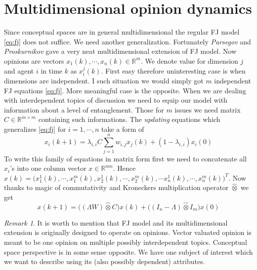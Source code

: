 \documentclass[leqno,12pt]{amsart}
\theoremstyle{remark}
\newtheorem{remark}[theorem]{Remark}
\theoremstyle{remark}
\theoremstyle{remark}
\theoremstyle{definition}
\numberwithin{equation}{section}
\newcommand{\R}{\ensuremath{\mathbb{R}}}
\begin{document}
\section{Multidimensional opinion dynamics}
Since conceptual spaces are in general multidimensional the regular FJ model \ref{eq:fj} does not suffice. We need another generalization. Fortunately \textit{Parsegov} and \textit{Proskurnikov} \cite{bib:parsegov} gave a very neat multidimensional extension of FJ model.
Now opinions are vectors $x_1(k), \cdots , x_n(k) \in \R^m$. We denote value for dimension $j$ and agent $i$ in time $k$ as $x^j_i(k)$. First easy therefore uninteresting case is when dimensions are independent. I such situation we would simply got $m$ independent FJ equations \ref{eq:fj}.
More meaningful case is the opposite. When we are dealing with interdependent topics of discussion we need to equip our model with information about a level of entanglement. Those for $m$ issues we need matrix $C\in\R^{m\times m}$ containing such informations.
The \textit{updating} equations which generalizes \ref{eq:fj} for $i = 1, \cdots, n$ take a form of
\begin{equation}\label{eq:mfjs}
    x_i(k+1)=\lambda_{i,i}C\sum\limits^n_{j=1}w_{i,j}x_j(k)+(1-\lambda_{i,i})x_i(0)
\end{equation}
To write this family of equations in matrix form first we need to concatenate all $x_i$'s into one column vector $x \in \R^{nm}$. Hence $x(k) = \big( x^1_1(k),\cdots , x^m_1(k), x^1_2(k), \cdots , x^m_2(k), \cdots x^1_n(k), \cdots , x^m_n(k) \big)^T$. Now thanks to magic of commutativity and Kroneckers multiplication operator $\hat\otimes$ we get
\begin{equation}\label{eq:mfj}
    x(k+1) = \big((\Lambda W) \hat\otimes C\big)x(k) + \big((I_n - \Lambda)\hat\otimes I_m\big)x(0)
\end{equation}
\begin{remark}
    It is worth to mention that FJ model and its multidimensional extension is originally designed to operate on opinions.  Vector valuated opinion is meant to be one opinion on multiple possibly interdependent topics. Conceptual space perspective is in some sense opposite. We have one subject of interest which we want to describe using its (also possibly dependent) attributes.
\end{remark}
\end{document}

